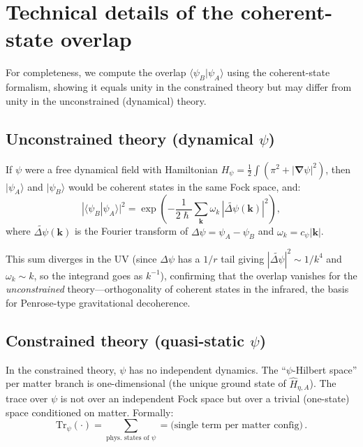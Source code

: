 \documentclass[12pt,a4paper]{article}
\theoremstyle{definition}
\theoremstyle{remark}
\newcommand{\hbar}{\hslash}
\newcommand{\Tr}{\mathrm{Tr}}
\newcommand{\grad}{\boldsymbol{\nabla}}
\begin{document}
\appendix

\section{Technical details of the coherent-state overlap}
\label{app:overlap}

For completeness, we compute the overlap $\langle\psi_B|\psi_A\rangle$ using
the coherent-state formalism, showing it equals unity in the constrained theory
but may differ from unity in the unconstrained (dynamical) theory.

\subsection{Unconstrained theory (dynamical $\psi$)}

If $\psi$ were a free dynamical field with Hamiltonian $H_\psi = \frac{1}{2}\int(\pi^2 + |\grad\psi|^2)$,
then $|\psi_A\rangle$ and $|\psi_B\rangle$ would be coherent states in the
same Fock space, and:
\begin{equation}
|\langle\psi_B|\psi_A\rangle|^2 = \exp\!\left(
-\frac{1}{2\hbar}\sum_{\mathbf{k}} \omega_k\,|\widetilde{\Delta\psi}(\mathbf{k})|^2
\right),
\end{equation}
where $\widetilde{\Delta\psi}(\mathbf{k})$ is the Fourier transform of
$\Delta\psi = \psi_A - \psi_B$ and $\omega_k = c_\psi|\mathbf{k}|$.

This sum diverges in the UV (since $\Delta\psi$ has a $1/r$ tail giving
$|\widetilde{\Delta\psi}|^2 \sim 1/k^4$ and $\omega_k \sim k$, so the
integrand goes as $k^{-1}$), confirming that the overlap vanishes for the
\emph{unconstrained} theory---orthogonality of coherent states in the infrared,
the basis for Penrose-type gravitational decoherence.

\subsection{Constrained theory (quasi-static $\psi$)}

In the constrained theory, $\psi$ has no independent dynamics.  The
``$\psi$-Hilbert space'' per matter branch is one-dimensional (the unique
ground state of $\hat{H}_{\eta,A}$).  The trace over $\psi$ is not over an
independent Fock space but over a trivial (one-state) space conditioned on
matter.  Formally:
\begin{equation}
\Tr_\psi(\cdot) = \sum_{\text{phys.\ states of }\psi}
= \text{(single term per matter config)}\,.
\end{equation}
\end{document}

